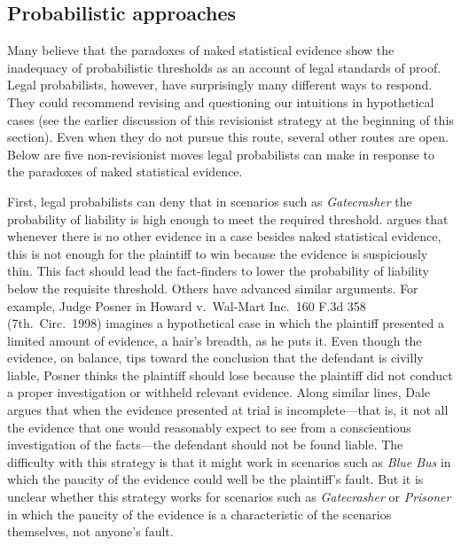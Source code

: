 \documentclass{article}
\begin{document}
\subsection{Probabilistic approaches}

Many believe that the paradoxes of naked statistical evidence show the inadequacy of probabilistic thresholds as an account of legal standards of proof. %
Legal probabilists, however, have surprisingly many different ways to respond. They could recommend revising and questioning our intuitions in hypothetical cases (see the earlier discussion of this revisionist strategy at the beginning of this section). Even when they do not pursue this route, several other routes are open. Below are five non-revisionist moves legal probabilists can make in response to the paradoxes of naked statistical evidence.  


First, legal probabilists can deny that in scenarios such as \textit{Gatecrasher} the probability of liability is high enough to meet the required threshold. \citet{kaye1979probability}
argues that whenever there is no other evidence in a case besides naked statistical evidence, this is not enough 
for the plaintiff to win because the evidence is suspiciously thin. This fact should lead the fact-finders to lower the probability of liability below the requisite threshold.  Others have advanced similar arguments. For example, Judge Posner in Howard v.\ Wal-Mart Inc.\ 160 F.3d 358 (7th.\ Circ.\ 1998) imagines a hypothetical case in which the plaintiff presented 
a limited amount of evidence, a hair's 
breadth, as he puts it. Even though the 
evidence, on balance, tips toward the conclusion 
that the defendant is civilly liable, Posner thinks the plaintiff should lose because the plaintiff did not conduct a proper investigation or withheld relevant evidence. Along similar lines, Dale \cite{nance2016}  argues that when the evidence presented at trial is incomplete---that is, it not all 
the evidence that one would reasonably expect to see from a conscientious investigation 
of the facts---the defendant should not be found liable. 
The difficulty with this strategy is that it might work in scenarios such as \textit{Blue Bus} in which the paucity of the evidence could well be the plaintiff's fault. But it is unclear whether this strategy works for scenarios such as \textit{Gatecrasher} or \textit{Prisoner} in which 
the paucity of the evidence is a characteristic 
of the scenarios themselves, not anyone's fault.  
\end{document}
